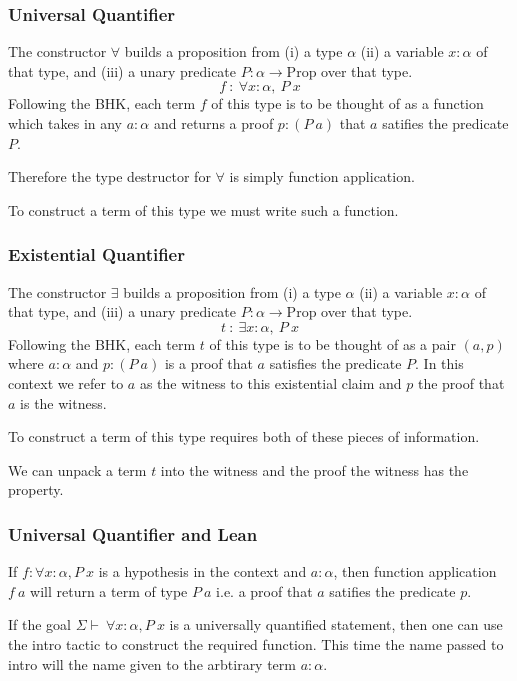 \documentclass{beamer}
\theoremstyle{indentDefn} \newtheorem{defn}[]{Definition}
\begin{document}
\begin{frame}
	\frametitle{Universal Quantifier}
	
	The constructor $\forall$ builds a proposition from (i) a type $\alpha$ (ii) a variable $x : \alpha$ of that type, and (iii) a unary predicate $P : \alpha \to \text{Prop}$ over that type.
	$$f \ : \ \forall x: \alpha, \ P \ x$$
	Following the BHK, each term $f$ of this type is to be thought of as a function which takes in any $a : \alpha$ and returns a proof $p : (P \ a)$ that $a$ satifies the predicate $P$. 
	
	Therefore the type destructor for $\forall$ is simply function application. 
	
	To construct a term of this type we must write such a function. 

\end{frame}

\begin{frame}
	\frametitle{Existential Quantifier}
	
	The constructor $\exists$ builds a proposition from (i) a type $\alpha$ (ii) a variable $x : \alpha$ of that type, and (iii) a unary predicate $P : \alpha \to \text{Prop}$ over that type.
	$$t \ : \ \exists x: \alpha, \ P \ x$$
	Following the BHK, each term $t$ of this type is to be thought of as a pair $(a, p)$ where $a : \alpha$ and $p : (P \ a)$ is a proof that $a$ satisfies the predicate $P$. In this context we refer to $a$ as the witness to this existential claim and $p$ the proof that $a$ is the witness. 
	
	To construct a term of this type requires both of these pieces of information. 
	
	We can unpack a term $t$ into the witness and the proof the witness has the property. 

\end{frame}

\begin{frame}
	\frametitle{Universal Quantifier and Lean}
	
	If $f : \forall x: \alpha, P \ x$ is a hypothesis in the context and $a : \alpha$, then function application $f \ a$ will return a term of type $P \ a$ i.e. a proof that $a$ satifies the predicate $p$. 
	
	If the goal $\Sigma \vdash \ \forall x : \alpha, P \ x$ is a universally quantified statement, then one can use the intro tactic to construct the required function. This time the name passed to intro will the name given to the arbtirary term $a : \alpha$. 
\end{frame}
\end{document}
